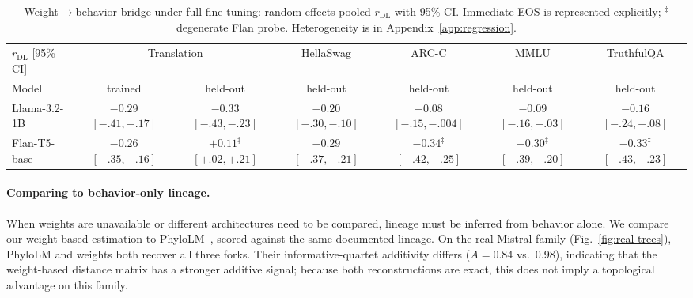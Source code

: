 \documentclass{article}
\theoremstyle{definition}
\theoremstyle{plain}
\begin{document}
\begin{table}[t]
\caption{Weight$\to$behavior bridge under full fine-tuning: random-effects pooled
  $r_{\mathrm{DL}}$ with 95\% CI. Immediate EOS is represented explicitly; $^\ddagger$degenerate
  Flan probe. Heterogeneity is in Appendix~\ref{app:regression}.}
\label{tab:behavior_holdout}
\centering
\small
\setlength{\tabcolsep}{5pt}
\begin{tabular}{lcccccc}
\toprule
$r_{\mathrm{DL}}$ [95\% CI] & \multicolumn{2}{c}{Translation} & HellaSwag & ARC-C & MMLU & TruthfulQA \\
\cmidrule(lr){2-3}
Model & trained & held-out & held-out & held-out & held-out & held-out \\
\midrule
Llama-3.2-1B & \shortstack{$-0.29$\\{\scriptsize$[-.41,-.17]$}} & \shortstack{$-0.33$\\{\scriptsize$[-.43,-.23]$}} & \shortstack{$-0.20$\\{\scriptsize$[-.30,-.10]$}} & \shortstack{$-0.08$\\{\scriptsize$[-.15,-.004]$}} & \shortstack{$-0.09$\\{\scriptsize$[-.16,-.03]$}} & \shortstack{$-0.16$\\{\scriptsize$[-.24,-.08]$}} \\
\addlinespace
Flan-T5-base & \shortstack{$-0.26$\\{\scriptsize$[-.35,-.16]$}} & \shortstack{$+0.11^{\ddagger}$\\{\scriptsize$[+.02,+.21]$}} & \shortstack{$-0.29$\\{\scriptsize$[-.37,-.21]$}} & \shortstack{$-0.34^{\ddagger}$\\{\scriptsize$[-.42,-.25]$}} & \shortstack{$-0.30^{\ddagger}$\\{\scriptsize$[-.39,-.20]$}} & \shortstack{$-0.33^{\ddagger}$\\{\scriptsize$[-.43,-.23]$}} \\
\bottomrule
\end{tabular}
\end{table}


\paragraph{Comparing to behavior-only lineage.}
\label{sec:results:blackbox}

When weights are unavailable or different architectures need to be compared, lineage must be inferred from behavior alone. We compare our weight-based
estimation to PhyloLM~\citep{yax2025phylolm}, scored against the
same documented lineage. On the real Mistral family (Fig.~\ref{fig:real-trees}), PhyloLM and weights
both recover all three forks. Their informative-quartet additivity differs ($A=0.84$ vs.\ $0.98$), indicating that the weight-based distance matrix has a stronger additive signal; because both reconstructions are exact, this does not imply a topological advantage on this family.
\end{document}
